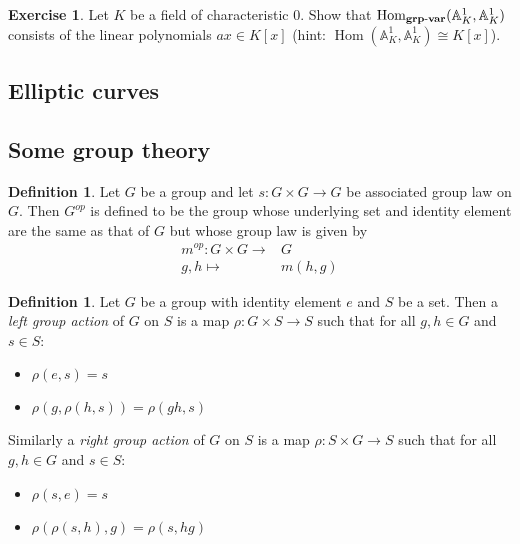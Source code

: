 \documentclass[a4paper,12pt,reqno]{amsart}
\newcommand{\field}[1]{\mathbb{#1}}  %
\newcommand{\A}{\field{A}}
\newcommand{\HomGrpVar}{\text{Hom}_{\bf grp\text{-}var}}
\DeclareMathOperator{\Hom}{Hom}
\theoremstyle{definition}
\newtheorem{definition}[lemma]{Definition}
\newtheorem{exercise}[lemma]{Exercise}
\numberwithin{lemma}{section}
\numberwithin{equation}{section}
\numberwithin{figure}{section}
\begin{document}
\begin{exercise}
Let $K$ be a field of characteristic $0$. Show that $\HomGrpVar(\A^1_K, \A^1_K)$ consists of the linear polynomials $ax \in K[x]$ (hint: $\Hom(\A^1_K, \A^1_K) \cong K[x]$). 
\end{exercise}

\subsection{Elliptic curves}

\subsection{Some group theory}

\begin{definition}Let $G$ be a group and let $s: G \times G \to G$ be associated group law on $G$. Then $G^{op}$ is defined to be the group whose underlying set and identity element are the same as that of $G$ but whose group law is given by \begin{align*}
	m^{op}: G \times G \to& G \\
	  g,h \mapsto& m(h,g)
	\end{align*}
\end{definition}

\begin{definition}\label{def:group_action}
	Let $G$ be a group with identity element $e$ and $S$ be a set. Then a \textit{left group action} of $G$ on $S$ is a map $\rho: G \times S \to S$  such that for all $g,h \in G$ and $s \in S$:
	\begin{itemize}
		\item $\rho(e, s) = s$
		\item $\rho(g,\rho(h,s))=\rho(gh,s)$
	\end{itemize}
Similarly a \textit{right group action} of $G$ on $S$ is a map $\rho: S \times G \to S$  such that for all $g,h \in G$ and $s \in S$:
\begin{itemize}
	\item $\rho(s,e) = s$
	\item $\rho(\rho(s,h),g)=\rho(s,hg)$
\end{itemize}
\end{definition}
\end{document}
